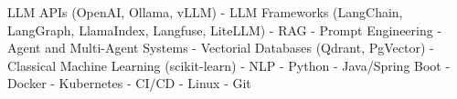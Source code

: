 \small{
LLM APIs (OpenAI, Ollama, vLLM) -
LLM Frameworks (LangChain, LangGraph, LlamaIndex, Langfuse, LiteLLM) -
RAG -
Prompt Engineering -
Agent and Multi-Agent Systems -
Vectorial Databases (Qdrant, PgVector) -
Classical Machine Learning (scikit-learn) -
NLP -
Python -
Java/Spring Boot -
Docker -
Kubernetes -
CI/CD -
Linux -
Git
}